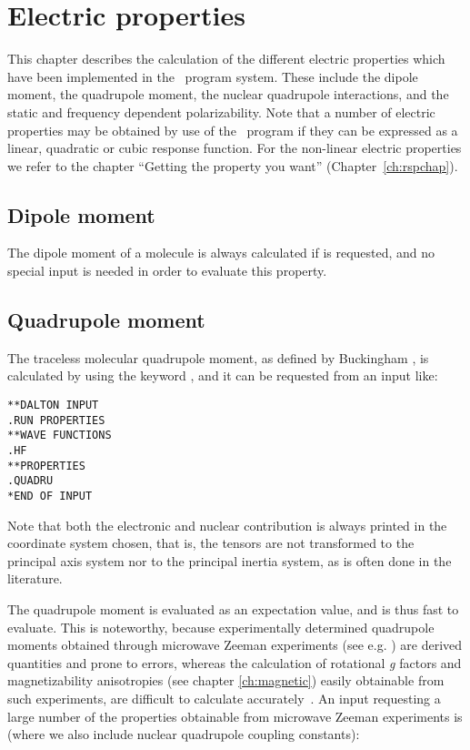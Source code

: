 \chapter{Electric properties}\label{ch:electric}

This chapter describes the calculation of the different electric
properties which have been implemented in the \siraba\ program system.
These include the dipole moment, the quadrupole
moment, the nuclear quadrupole
interactions,  and the static and frequency dependent
polarizability. Note that a number of electric
properties may be
obtained by use of the \resp\ program if they can be expressed as a
linear, quadratic or cubic response function. For the non-linear
electric properties we refer to the chapter ``Getting the property you
want'' (Chapter~\ref{ch:rspchap}).

\section{Dipole moment}\label{sec:dipmom}

The dipole moment of a  molecule is always
calculated if  is
requested, and no special input is needed in order to evaluate this property.

\section{Quadrupole moment}\label{sec:quadmom}

The traceless molecular quadrupole moment, as
defined by Buckingham
\cite{adbacp12}, is calculated by using the keyword , and
it can be requested from an input like:

\begin{verbatim}
**DALTON INPUT
.RUN PROPERTIES
**WAVE FUNCTIONS
.HF
**PROPERTIES
.QUADRU
*END OF INPUT
\end{verbatim}

Note that both the electronic and nuclear contribution is always
printed in the coordinate system chosen, that is, the tensors are not
transformed to the principal axis system nor to the principal inertia
system, as is often done in the literature.

The quadrupole moment is evaluated as an expectation value, and is
thus fast to evaluate. This is noteworthy, because experimentally
determined quadrupole moments obtained through microwave Zeeman experiments
(see e.g.  \cite{whmklwhfjcp48,jsdhszna46}) are derived
quantities and prone to errors,
whereas the calculation of rotational {\em g} factors and magnetizability
anisotropies (see chapter
\ref{ch:magnetic}) easily obtainable from such
experiments, are difficult to calculate accurately~\cite{krthcpl264}. An input
requesting a large number of the properties obtainable from microwave
Zeeman experiments is (where we also include nuclear quadrupole
coupling constants):

